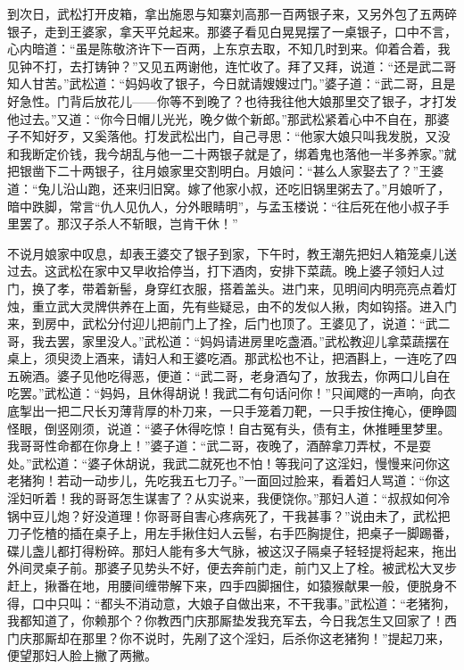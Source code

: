 到次日，武松打开皮箱，拿出施恩与知寨刘高那一百两银子来，又另外包了五两碎银子，走到王婆家，拿天平兑起来。那婆子看见白晃晃摆了一桌银子，口中不言，心内暗道：“虽是陈敬济许下一百两，上东京去取，不知几时到来。仰着合着，我见钟不打，去打铸钟？”又见五两谢他，连忙收了。拜了又拜，说道：“还是武二哥知人甘苦。”武松道：“妈妈收了银子，今日就请嫂嫂过门。”婆子道：“武二哥，且是好急性。门背后放花儿——你等不到晚了？也待我往他大娘那里交了银子，才打发他过去。”又道：“你今日帽儿光光，晚夕做个新郎。”那武松紧着心中不自在，那婆子不知好歹，又奚落他。打发武松出门，自己寻思：“他家大娘只叫我发脱，又没和我断定价钱，我今胡乱与他一二十两银子就是了，绑着鬼也落他一半多养家。”就把银凿下二十两银子，往月娘家里交割明白。月娘问：“甚么人家娶去了？”王婆道：“兔儿沿山跑，还来归旧窝。嫁了他家小叔，还吃旧锅里粥去了。”月娘听了，暗中跌脚，常言“仇人见仇人，分外眼睛明”，与孟玉楼说：“往后死在他小叔子手里罢了。那汉子杀人不斩眼，岂肯干休！”

不说月娘家中叹息，却表王婆交了银子到家，下午时，教王潮先把妇人箱笼桌儿送过去。这武松在家中又早收拾停当，打下酒肉，安排下菜蔬。晚上婆子领妇人过门，换了孝，带着新髻，身穿红衣服，搭着盖头。进门来，见明间内明亮亮点着灯烛，重立武大灵牌供养在上面，先有些疑忌，由不的发似人揪，肉如钩搭。进入门来，到房中，武松分付迎儿把前门上了拴，后门也顶了。王婆见了，说道：“武二哥，我去罢，家里没人。”武松道：“妈妈请进房里吃盏酒。”武松教迎儿拿菜蔬摆在桌上，须臾烫上酒来，请妇人和王婆吃酒。那武松也不让，把酒斟上，一连吃了四五碗酒。婆子见他吃得恶，便道：“武二哥，老身酒勾了，放我去，你两口儿自在吃罢。”武松道：“妈妈，且休得胡说！我武二有句话问你！”只闻飕的一声响，向衣底掣出一把二尺长刃薄背厚的朴刀来，一只手笼着刀靶，一只手按住掩心，便睁圆怪眼，倒竖刚须，说道：“婆子休得吃惊！自古冤有头，债有主，休推睡里梦里。我哥哥性命都在你身上！”婆子道：“武二哥，夜晚了，酒醉拿刀弄杖，不是耍处。”武松道：“婆子休胡说，我武二就死也不怕！等我问了这淫妇，慢慢来问你这老猪狗！若动一动步儿，先吃我五七刀子。”一面回过脸来，看着妇人骂道：“你这淫妇听着！我的哥哥怎生谋害了？从实说来，我便饶你。”那妇人道：“叔叔如何冷锅中豆儿炮？好没道理！你哥哥自害心疼病死了，干我甚事？”说由未了，武松把刀子忔楂的插在桌子上，用左手揪住妇人云髻，右手匹胸提住，把桌子一脚踢番，碟儿盏儿都打得粉碎。那妇人能有多大气脉，被这汉子隔桌子轻轻提将起来，拖出外间灵桌子前。那婆子见势头不好，便去奔前门走，前门又上了栓。被武松大叉步赶上，揪番在地，用腰间缠带解下来，四手四脚捆住，如猿猴献果一般，便脱身不得，口中只叫：“都头不消动意，大娘子自做出来，不干我事。”武松道：“老猪狗，我都知道了，你赖那个？你教西门庆那厮垫发我充军去，今日我怎生又回家了！西门庆那厮却在那里？你不说时，先剐了这个淫妇，后杀你这老猪狗！”提起刀来，便望那妇人脸上撇了两撇。

